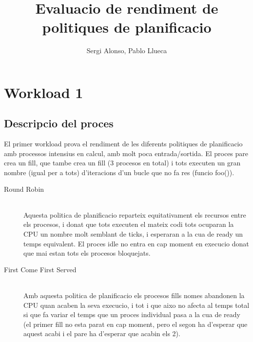 \documentclass{article}
\title{Evaluacio de rendiment de politiques de planificacio}
\author{Sergi Alonso, Pablo Llueca}
\begin{document}

\section{Workload 1}
\subsection{Descripcio del proces}
El primer workload prova el rendiment de les diferents politiques de planificacio amb processos intensius en calcul, amb molt poca entrada/sortida. El proces pare crea un fill, que tambe crea un fill (3 procesos en total) i tots executen un gran nombre (igual per a tots) d'iteracions d'un bucle que no fa res (funcio foo()).
\begin{description}
  \item [Round Robin] \hfill \\
    Aquesta politica de planificacio reparteix equitativament els recursos entre els procesos, i donat que tots executen el mateix codi tots ocuparan la CPU un nombre molt semblant de ticks, i esperaran a la cua de ready un temps equivalent. El proces idle no entra en cap moment en execucio donat que mai estan tots els procesos bloquejats.
  \item  [First Come First Served] \hfill \\
    Amb aquesta politica de planificacio els procesos fills nomes abandonen la CPU quan acaben la seva execucio, i tot i que aixo no afecta al temps total si que fa variar el temps que un proces individual pasa a la cua de ready (el primer fill no esta parat en cap moment, pero el segon ha d'esperar que aquest acabi i el pare ha d'esperar que acabin els 2).
  \end{description}
\end{document}
